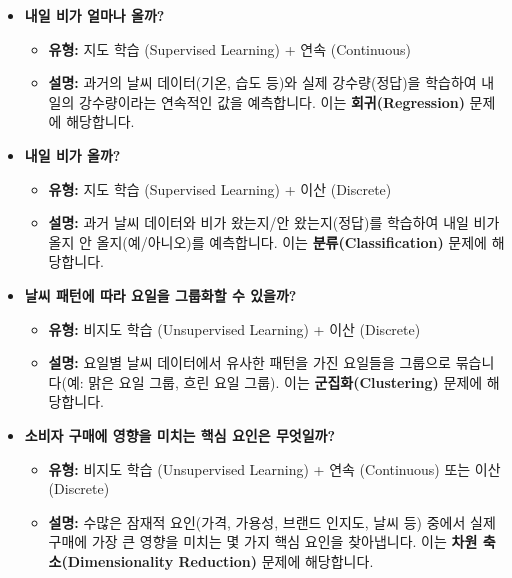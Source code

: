 \documentclass[11pt,a4paper]{article}
\begin{document}
\begin{tcolorbox}[examplebox={ML 학습 유형 예시}]
\begin{itemize}
    \item \textbf{내일 비가 얼마나 올까?}
    \begin{itemize}
        \item \textbf{유형:} 지도 학습 (Supervised Learning) + 연속 (Continuous)
        \item \textbf{설명:} 과거의 날씨 데이터(기온, 습도 등)와 실제 강수량(정답)을 학습하여 내일의 강수량이라는 연속적인 값을 예측합니다. 이는 \textbf{회귀(Regression)} 문제에 해당합니다.
    \end{itemize}
    \item \textbf{내일 비가 올까?}
    \begin{itemize}
        \item \textbf{유형:} 지도 학습 (Supervised Learning) + 이산 (Discrete)
        \item \textbf{설명:} 과거 날씨 데이터와 비가 왔는지/안 왔는지(정답)를 학습하여 내일 비가 올지 안 올지(예/아니오)를 예측합니다. 이는 \textbf{분류(Classification)} 문제에 해당합니다.
    \end{itemize}
    \item \textbf{날씨 패턴에 따라 요일을 그룹화할 수 있을까?}
    \begin{itemize}
        \item \textbf{유형:} 비지도 학습 (Unsupervised Learning) + 이산 (Discrete)
        \item \textbf{설명:} 요일별 날씨 데이터에서 유사한 패턴을 가진 요일들을 그룹으로 묶습니다(예: 맑은 요일 그룹, 흐린 요일 그룹). 이는 \textbf{군집화(Clustering)} 문제에 해당합니다.
    \end{itemize}
    \item \textbf{소비자 구매에 영향을 미치는 핵심 요인은 무엇일까?}
    \begin{itemize}
        \item \textbf{유형:} 비지도 학습 (Unsupervised Learning) + 연속 (Continuous) 또는 이산 (Discrete)
        \item \textbf{설명:} 수많은 잠재적 요인(가격, 가용성, 브랜드 인지도, 날씨 등) 중에서 실제 구매에 가장 큰 영향을 미치는 몇 가지 핵심 요인을 찾아냅니다. 이는 \textbf{차원 축소(Dimensionality Reduction)} 문제에 해당합니다.
    \end{itemize}
\end{itemize}
\end{tcolorbox}
\end{document}
